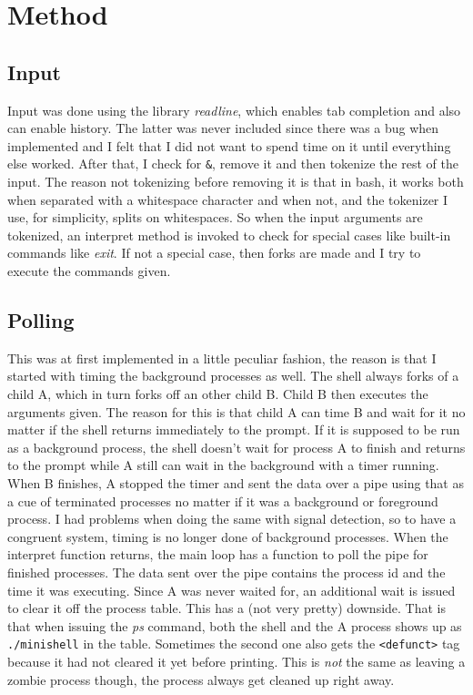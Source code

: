 \documentclass{article}
\begin{document}
\section{Method}
    \subsection{Input}
        Input was done using the library \emph{readline}, which enables tab
        completion and also can enable history. The latter was never included
        since there was a bug when implemented and I felt that I did not want
        to spend time on it until everything else worked. After that, I check
        for \texttt{\&}, remove it and then tokenize the rest of the input.
        The reason not tokenizing before removing it is that in bash, it
        works both when separated with a whitespace character and when not,
        and the tokenizer I use, for simplicity, splits on whitespaces. So
        when the input arguments are tokenized, an interpret method is
        invoked to check for special cases like built-in commands like
        \emph{exit}. If not a special case, then forks are made and I try
        to execute the commands
        given. 
    \subsection{Polling}
        This was at first implemented in a little peculiar fashion, the reason
        is that I started with timing the background processes as well.  The
        shell always forks of a child A, which in turn forks off an other child
        B. Child B then executes the arguments given. The reason for this is
        that child A can time B and wait for it no matter if the shell returns
        immediately to the prompt. If it is supposed to be run as a background
        process, the shell doesn't wait for process A to finish and returns to
        the prompt while A still can wait in the background with a timer
        running. When B finishes, A stopped the timer and sent the data over a
        pipe using that as a cue of terminated processes no matter if it was a
        background or foreground process.  I had problems when doing the same
        with signal detection, so to have a congruent system, timing is no
        longer done of background processes. When the interpret function
        returns, the main loop has a function to poll the pipe for finished
        processes. The data sent over the pipe contains the process id and the
        time it was executing.  Since A was never waited for, an additional
        wait is issued to clear it off the process table. This has a (not very
        pretty) downside. That is that when issuing the \emph{ps} command, both
        the shell and the A process shows up as \texttt{./minishell} in the
        table.  Sometimes the second one also gets the \texttt{<defunct>} tag
        because it had not cleared it yet before printing. This is \emph{not}
        the same as leaving a zombie process though, the process always get
        cleaned up right away.
\end{document}
